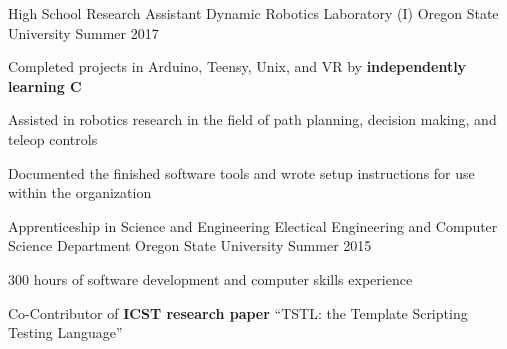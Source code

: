 \begin{cventries}
  \cventry
    {High School Research Assistant} %
    {Dynamic Robotics Laboratory (I)} %
    {Oregon State University} %
    {Summer 2017} %
    {
      \begin{cvitems} %
        \item {Completed projects in Arduino, Teensy, Unix, and VR by \textbf{independently learning C} }
        \item {Assisted in robotics research in the field of path planning, decision making, and teleop controls}
        \item {Documented the finished software tools and wrote setup instructions for use within the organization}
      \end{cvitems}
    }




  \cventry
    {Apprenticeship in Science and Engineering} %
    {Electical Engineering and Computer Science Department} %
    {Oregon State University} %
    {Summer 2015} %
    {
      \begin{cvitems} %
        \item {300 hours of software development and computer skills experience}
        \item {Co-Contributor of \textbf{ICST research paper} “TSTL: the Template Scripting Testing Language”}
      \end{cvitems}
    }
\end{cventries}
